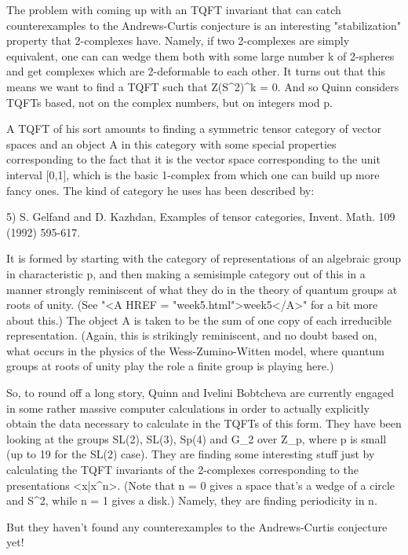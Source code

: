 The problem with coming up with an TQFT invariant that can catch
counterexamples to the Andrews-Curtis conjecture is an interesting
"stabilization" property that 2-complexes have.  Namely, if two
2-complexes are simply equivalent, one can can wedge them both with some
large number k of 2-spheres and get complexes which are 2-deformable to
each other.  It turns out that this means we want to find a TQFT such
that Z(S^2)^k = 0.   And so Quinn considers TQFTs based, not on the
complex numbers, but on integers mod p.  

A TQFT of his sort amounts to finding a symmetric tensor category of
vector spaces and an object A in this category with some special
properties corresponding to the fact that it is the vector space
corresponding to the unit interval [0,1], which is the basic 1-complex
from which one can build up more fancy ones.  The kind of category he
uses has been described by:

5)  S. Gelfand and D. Kazhdan, Examples of tensor categories, Invent.
Math. 109 (1992) 595-617.

It is formed by starting with the category of representations of an
algebraic group in characteristic p, and then making a semisimple
category out of this in a manner strongly reminiscent of what they do in
the theory of quantum groups at roots of unity.  (See "<A HREF = "week5.html">week5</A>" for a bit
more about this.)  The object A is taken to be the sum of one copy of
each irreducible representation.  (Again, this is strikingly
reminiscent, and no doubt based on, what occurs in the physics of the
Wess-Zumino-Witten model, where quantum groups at roots of unity play
the role a finite group is playing here.)  

So, to round off a long story, Quinn and Ivelini Bobtcheva are currently
engaged in some rather massive computer calculations in order to
actually explicitly obtain the data necessary to calculate in the TQFTs
of this form.  They have been looking at the groups SL(2), SL(3), Sp(4)
and G_2 over Z_p, where p is small (up to 19 for the SL(2) case).  They
are finding some interesting stuff just by calculating the TQFT
invariants of the 2-complexes corresponding to the presentations
<x|x^n>.  (Note that n = 0 gives a space that's a wedge of a circle and
S^2, while n = 1 gives a disk.)  Namely, they are finding periodicity in
n.  

But they haven't found any counterexamples to the Andrews-Curtis
conjecture yet!



